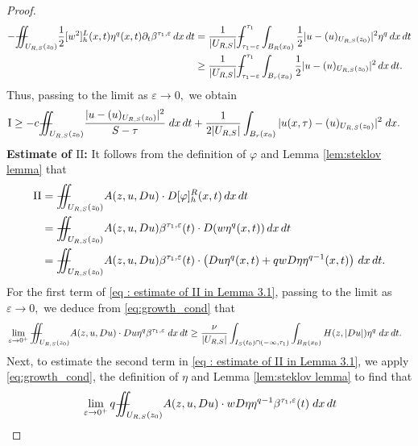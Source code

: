 \documentclass[notitlepage,11pt,reqno]{amsart}
\theoremstyle{definition}
\numberwithin{equation}{section}
\newcommand{\iintss}{{\int\hspace{-0.28cm}\int}}
\newcommand{ \miints }{{\iintss\hspace{-0.56cm} -\hspace{-0.15cm}-}}
\newcommand{\miint}[1]{{\miints_{\hspace{-0.13cm}#1}}}
\def\Xint#1{\mathchoice
	{\XXint\displaystyle\textstyle{#1}}%
	{\XXint\textstyle\scriptstyle{#1}}%
	{\XXint\scriptstyle\scriptscriptstyle{#1}}%
	{\XXint\scriptscriptstyle\scriptscriptstyle{#1}}%
	\!\int}
\def\XXint#1#2#3{{\setbox0=\hbox{$#1{#2#3}{\int}$}
		\vcenter{\hbox{$#2#3$}}\kern-.50\wd0}}
\def\Xint#1{\mathchoice
	{\XXint\displaystyle\textstyle{#1}}%
	{\XXint\textstyle\scriptstyle{#1}}%
	{\XXint\scriptstyle\scriptscriptstyle{#1}}%
	{\XXint\scriptscriptstyle\scriptscriptstyle{#1}}%
	\!\int}
\def\XXint#1#2#3{{\setbox0=\hbox{$#1{#2#3}{\int}$}
		\vcenter{\hbox{$#2#3$}}\kern-.50\wd0}}
\def\dashint{\Xint-}
\begin{document}
\begin{proof}
    \begin{align*}
        -\miint{U_{R,S}(z_0)} \frac{1}{2} [w^2]^L_h (x, t)\eta^q (x, t)\partial_t \beta^{\tau_1, \varepsilon} \, dx\, dt &=\frac{1}{|U_{R, S}|}\dashint_{\tau_1-\varepsilon}^{\tau_1}\int_{B_R(x_0)}\frac{1}{2} |u-(u)_{U_{R, S}(z_0)}|^2 \eta^q \,dx \,dt\\
        & \geq \frac{1}{|U_{R, S}|}\dashint_{\tau_1-\varepsilon}^{\tau_1}\int_{B_r(x_0)} \frac{1}{2} |u-(u)_{U_{R, S}(z_0)}|^2\, dx \,dt.
    \end{align*}
    Thus, passing to the limit as $\varepsilon \to 0,$ we obtain
    \begin{equation}\label{eq: final estimate of I in Lemma 3.1}
        \begin{aligned}
             \mathrm{I} &\geq -c\miint{U_{R,S}(z_0)}\frac{|u-(u)_{U_{R,S}(z_0)}|^2}{S-\tau} \; dx\, dt +\frac{1}{2|U_{R,S}|}\int_{B_r(x_0)} |u(x,\tau)-(u)_{U_{R, S}(z_0)}|^2\; dx.
        \end{aligned}
    \end{equation}
\noindent \textbf{Estimate of $\mathrm{II}$:} It follows from the definition of $\varphi$ and Lemma \ref{lem:steklov lemma} that
    \begin{align}\nonumber
        \mathrm{II}&=\miint{U_{R,S}(z_0)}A(z, u,  Du)\cdot D[\varphi]^R_h(x, t)\, dx\,dt\\ 
        &=\miint{U_{R,S}(z_0)}A(z, u,  Du)\beta^{\tau_1, \varepsilon}(t)\cdot D(w \eta^q (x, t))\, dx\, dt\nonumber \\
        &=\miint{U_{R,S}(z_0)}A(z, u,  Du)\beta^{\tau_1, \varepsilon}(t)\cdot\left(Du \eta^q(x, t)+qwD\eta \eta^{q-1}(x, t)\right)\, dx\, dt.\label{eq : estimate of II in Lemma 3.1}
    \end{align}
For the first term of \eqref{eq : estimate of II in Lemma 3.1}, passing to the limit as $\varepsilon \to 0,$ we deduce from \eqref{eq:growth_cond} that
    \begin{align*}
        &\lim_{\varepsilon \rightarrow 0^+} \miint{U_{R,S}(z_0)} A(z, u, Du)\cdot Du\eta^q \beta^{\tau_1, \varepsilon} \;dx\, dt \geq \frac{\nu}{|U_{R, S}|}\int_{I_S(t_0)\cap(-\infty,\tau_1)}\int_{B_R(x_0)} H(z,|Du|)\eta^q \; dx\, dt.
    \end{align*}
    Next, to estimate the second term in \eqref{eq : estimate of II in Lemma 3.1}, we apply \eqref{eq:growth_cond}, the definition of $\eta$ and Lemma \ref{lem:steklov lemma} to find that 
    \begin{align*}
        &\lim_{\varepsilon \rightarrow 0^+} q\miint{U_{R,S}(z_0)} A(z, u, Du)\cdot w D\eta \eta^{q-1}\beta^{\tau_1, \varepsilon}(t) \; dx\, dt\\

\end{align*}
\end{proof}
\end{document}
